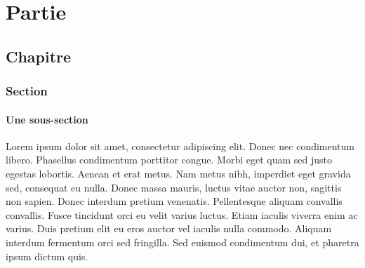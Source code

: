 \documentclass{report}
\begin{document}
\part{Partie}
\chapter{Chapitre}
\section{Section}
\subsection{Une sous-section}
Lorem ipsum dolor sit amet, consectetur adipiscing elit.
Donec nec condimentum libero. Phasellus condimentum porttitor congue.
Morbi eget quam sed justo egestas lobortis. Aenean et erat metus.
Nam metus nibh, imperdiet eget gravida sed, consequat eu nulla. Donec massa mauris, luctus vitae auctor non, sagittis non sapien.
Donec interdum pretium venenatis. Pellentesque aliquam convallis convallis.
Fusce tincidunt orci eu velit varius luctus. Etiam iaculis viverra enim ac varius.
Duis pretium elit eu eros auctor vel iaculis nulla commodo. Aliquam interdum fermentum orci sed fringilla.
Sed euismod condimentum dui, et pharetra ipsum dictum quis.
\end{document}
